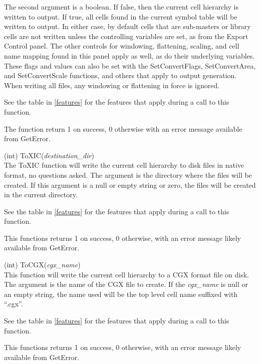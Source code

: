 \begin{description}
The second argument is a boolean.  If false, then the current cell
hierarchy is written to output.  If true, all cells found in the
current symbol table will be written to output.  In either case, by
default cells that are sub-masters or library cells are not written
unless the controlling variables are set, as from the {\cb Export
Control} panel.  The other controls for windowing, flattening,
scaling, and cell name mapping found in this panel apply as well, as
do their underlying variables.  These flags and values can also be set
with the {\vt SetConvertFlags}, {\vt SetConvertArea}, and {\vt
SetConvertScale} functions, and others that apply to output
generation.  When writing all files, any windowing or flattening in
force is ignored.

See the table in \ref{features} for the features that apply during a
call to this function.

The function return 1 on success, 0 otherwise with an error message
available from {\vt GetError}.

\item{(int) \vt ToXIC({\it destination\_dir\/})}\\
The {\vt ToXIC} function will write the current cell hierarchy to disk
files in native format, no questions asked.  The argument is the
directory where the {\Xic} files will be created.  If this argument is
a null or empty string or zero, the {\Xic} files will be created in
the current directory.

See the table in \ref{features} for the features that apply during a
call to this function.

This functions returns 1 on success, 0 otherwise, with an error
message likely available from {\vt GetError}.

\item{(int) \vt ToCGX({\it cgx\_name\/})}\\
This function will write the current cell hierarchy to a CGX format
file on disk.  The argument is the name of the CGX file to create.  If
the {\it cgx\_name} is null or an empty string, the name used will be
the top level cell name suffixed with ``{\vt .cgx}''.

See the table in \ref{features} for the features that apply during a
call to this function.

This functions returns 1 on success, 0 otherwise, with an error
message likely available from {\vt GetError}.


\end{description}
